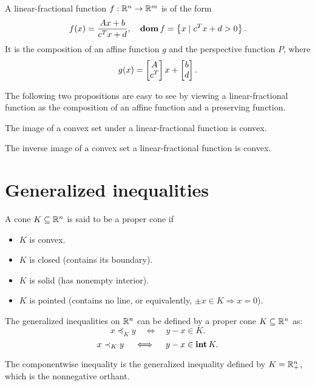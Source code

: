 \documentclass[12pt]{article}
\begin{document}
\begin{definition}
    A \textnormal{linear-fractional function} \(f:\mathbb R^n\to\mathbb R^m\) is of the form
    \[f(x)=\frac{Ax+b}{c^Tx+d},\quad\operatorname{\mathbf{dom}} f=\left\{x\mid c^Tx+d>0\right\}.\]
    It is the composition of an affine function \(g\) and the perspective function \(P\), where
    \[g(x)=\begin{bmatrix}A\\c^T\end{bmatrix}x+\begin{bmatrix}b\\d\end{bmatrix}.\]
\end{definition}

The following two propositions are easy to see by viewing a linear-fractional function as the composition of an affine function and a preserving function.

\begin{proposition}
    The image of a convex set under a linear-fractional function is convex.
\end{proposition}

\begin{proposition}
    The inverse image of a convex set a linear-fractional function is convex.
\end{proposition}

\section{Generalized inequalities}

\begin{definition}
    A cone \(K\subseteq\mathbb R^n\) is said to be a \textnormal{proper cone} if
    \begin{itemize}
        \item \(K\) is convex.
        \item \(K\) is closed (contains its boundary).
        \item \(K\) is solid (has nonempty interior).
        \item \(K\) is pointed (contains no line, or equivalently, \(\pm x\in K\Rightarrow x=0\)).
    \end{itemize}
\end{definition}

\begin{definition}
    The generalized inequalities on \(\mathbb R^n\) can be defined by a proper cone \(K\subseteq\mathbb R^n\) as:
    \[x\preceq_K y\quad\iff\quad y-x\in K.\]
    \[x\prec_K y\quad\iff\quad y-x\in\operatorname{\mathbf{int}} K.\]
\end{definition}

\begin{example}
    The componentwise inequality is the generalized inequality defined by \(K=\mathbb R_+^n\), which is the nonnegative orthant.
\end{example}
\end{document}

